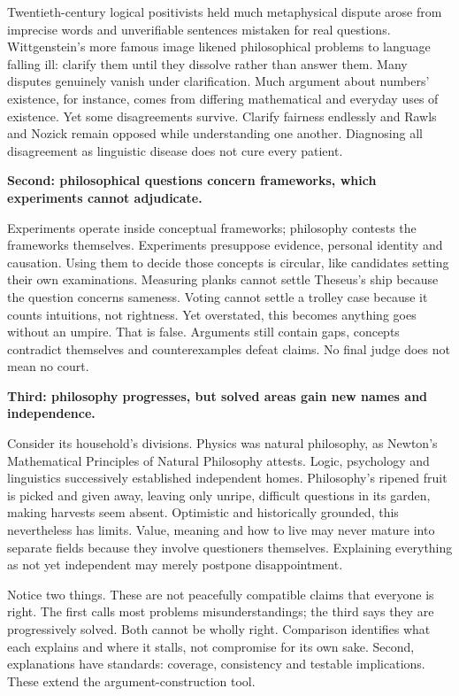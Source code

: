 Twentieth-century logical positivists held much metaphysical dispute arose from imprecise words and unverifiable sentences mistaken for real questions. Wittgenstein's more famous image likened philosophical problems to language falling ill: clarify them until they dissolve rather than answer them. Many disputes genuinely vanish under clarification. Much argument about numbers' existence, for instance, comes from differing mathematical and everyday uses of existence. Yet some disagreements survive. Clarify fairness endlessly and Rawls and Nozick remain opposed while understanding one another. Diagnosing all disagreement as linguistic disease does not cure every patient.

\textbf{Second: philosophical questions concern frameworks, which experiments cannot adjudicate.}

Experiments operate inside conceptual frameworks; philosophy contests the frameworks themselves. Experiments presuppose evidence, personal identity and causation. Using them to decide those concepts is circular, like candidates setting their own examinations. Measuring planks cannot settle Theseus's ship because the question concerns sameness. Voting cannot settle a trolley case because it counts intuitions, not rightness. Yet overstated, this becomes anything goes without an umpire. That is false. Arguments still contain gaps, concepts contradict themselves and counterexamples defeat claims. No final judge does not mean no court.

\textbf{Third: philosophy progresses, but solved areas gain new names and independence.}

Consider its household's divisions. Physics was natural philosophy, as Newton's Mathematical Principles of Natural Philosophy attests. Logic, psychology and linguistics successively established independent homes. Philosophy's ripened fruit is picked and given away, leaving only unripe, difficult questions in its garden, making harvests seem absent. Optimistic and historically grounded, this nevertheless has limits. Value, meaning and how to live may never mature into separate fields because they involve questioners themselves. Explaining everything as not yet independent may merely postpone disappointment.

Notice two things. These are not peacefully compatible claims that everyone is right. The first calls most problems misunderstandings; the third says they are progressively solved. Both cannot be wholly right. Comparison identifies what each explains and where it stalls, not compromise for its own sake. Second, explanations have standards: coverage, consistency and testable implications. These extend the argument-construction tool.

